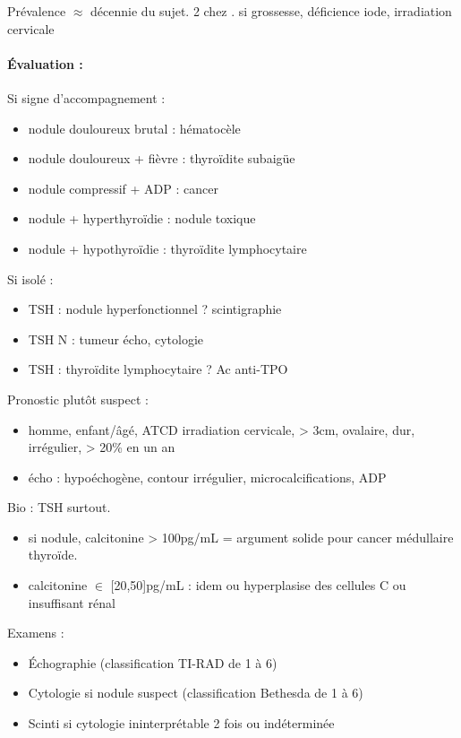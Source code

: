 \documentclass[11pt]{article}
\begin{document}
Prévalence \(\approx\) décennie du sujet. \texttimes{} 2 chez \female. \inc si grossesse,
déficience iode, irradiation cervicale

\paragraph{Évaluation :}
\label{sec:org69dd6d1}
Si signe d'accompagnement :
\begin{itemize}
\item nodule douloureux brutal : hématocèle
\item nodule douloureux + fièvre : thyroïdite subaigüe
\item nodule compressif + ADP : cancer
\item nodule + hyperthyroïdie : nodule toxique
\item nodule + hypothyroïdie : thyroïdite lymphocytaire
\end{itemize}
Si isolé : 
\begin{itemize}
\item TSH \dec : nodule hyperfonctionnel ? \thus scintigraphie
\item TSH N : tumeur \thus écho, cytologie
\item TSH \inc : thyroïdite lymphocytaire ? \thus Ac anti-TPO
\end{itemize}

Pronostic plutôt suspect : 
\begin{itemize}
\item homme, enfant/âgé, ATCD irradiation cervicale, > 3cm, ovalaire, dur, irrégulier, > 20\% en un an
\item écho : hypoéchogène, contour irrégulier, microcalcifications, ADP
\end{itemize}

Bio : TSH surtout. 
\begin{itemize}
\item si nodule, calcitonine > 100pg/mL = argument solide pour cancer médullaire thyroïde.
\item calcitonine \(\in\) [20,50]pg/mL : idem ou hyperplasise des cellules C ou insuffisant rénal
\end{itemize}

Examens : 
\begin{itemize}
\item Échographie (classification TI-RAD de 1 à 6)
\item Cytologie si nodule suspect (classification Bethesda de 1 à 6)
\item Scinti si cytologie ininterprétable 2 fois ou indéterminée
\end{itemize}
\end{document}
